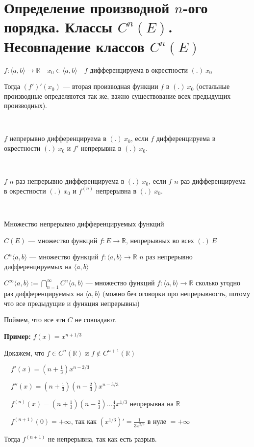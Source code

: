 \section{Определение производной $n$-ого порядка. Классы $C^n(E)$. Несовпадение классов $C^n(E)$ \href{https://youtu.be/au9-34CerJM?t=1866}{\Walley}}

\begin{conj} 
    $f: \langle a, b \rangle \rightarrow \mathbb{R} \quad x_0 \in \langle a, b \rangle \quad f$ дифференцируема в окрестности $(.) \ x_0$

    Тогда $(f')'(x_0)$ --- вторая производная функции $f$ в $(.) \ x_0$ (остальные производные определяются так же, важно существование всех предыдущих производных).
\end{conj}
\
\begin{conj}
    $f$ непрерывно дифференцируема в $(.) \ x_0$, если $f$ дифференцируема в окрестности $(.) \ x_0$ и $f'$ непрерывна в $(.) \ x_0$.
\end{conj}
\
\begin{conj}
    $f$ $n$ раз непрерывно дифференцируема в $(.) \ x_0$, если $f$ $n$ раз дифференцируема в окрестности $(.) \ x_0$ и $f^{(n)}$ непрерывна в $(.) \ x_0$.
\end{conj}
\
\begin{conj}
    Множество непрерывно дифференцируемых функций

    $C(E)$ --- множество функций $f: E \rightarrow \mathbb{R}$, непрерывных во всех $(.) \ E$

    $C^n \langle a, b \rangle$ --- множество функций $f: \langle a, b \rangle \rightarrow \mathbb{R}$ $n$ раз непрерывно дифференцируемых на $\langle a, b \rangle$

    $C^\infty \langle a, b \rangle := \bigcap\limits_{n=1}^{\infty} C^n \langle a, b \rangle$ --- множество функций $f: \langle a, b \rangle \rightarrow \mathbb{R}$ сколько угодно раз дифференцируемых на $\langle a, b \rangle$ (можно без оговорки про непрерывность, потому что все предыдущие и функция непрерывны)
\end{conj}

Поймем, что все эти $C$ не совпадают.
\par\medskip
\textbf{Пример:} $f(x) = x^{n+1/3}$

Докажем, что $f \in C^n(\mathbb{R})$ и $f \notin C^{n+1}(\mathbb{R})$

$\quad f'(x) = (n + \frac{1}{3})x^{n-2/3}$

$\quad f''(x) = (n + \frac{1}{3})(n - \frac{2}{3})x^{n-5/3}$

$\quad f^{(n)}(x) = (n + \frac{1}{3})(n - \frac{2}{3}) \dots \frac{4}{3} x^{1/3}$ непрерывна на $\mathbb{R}$

$\quad f^{(n+1)}(0) = +\infty $, так как $(x^{1/3})' = \frac{1}{3x^{2/3}}$ в нуле $= +\infty$

Тогда $f^{(n+1)}$ не непрерывна, так как есть разрыв.


